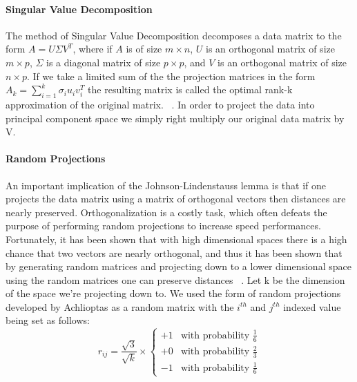 \paragraph{Singular Value Decomposition} %
\label{par:singular_value_decomposition}
The method of Singular Value Decomposition decomposes a data matrix to the form $A = U \Sigma V^T$, where 
if $A$ is of size $m \times n$, $U$ is an orthogonal matrix of size $m \times p$, $\Sigma$ is a diagonal matrix of size $p \times p$, and $V$ is an orthogonal matrix of size $n \times p$. If we take a limited sum of the the projection matrices in the form $A_k = \sum_{i=1}^k\sigma_iu_iv_i^T$ the resulting matrix is called the optimal rank-k approximation of the original matrix. ~\cite{LecturePCA}. In order to project the data into principal component space we simply right multiply our original data matrix by V.
\paragraph{Random Projections} %
\label{par:random_projections}
An important implication of the Johnson-Lindenstauss lemma is that if one projects the data matrix using a matrix of orthogonal vectors then distances are nearly preserved. Orthogonalization is a costly task, which often defeats the purpose of performing random projections to increase speed performances. Fortunately, it has been shown that with high dimensional spaces there is a high chance that two vectors are nearly orthogonal, and thus it has been shown that by generating random matrices and projecting down to a lower dimensional space using the random matrices one can preserve distances ~\cite{sulic2010dimensionality}. Let k be the dimension of the space we're projecting down to. We used the form of random projections developed by Achlioptas as a random matrix with the $i^{th}$ and $j^{th}$ indexed value being set as follows:
	\begin{equation}
 		r_{ij} = \frac{\sqrt{3}}{\sqrt{k}} \times \left\{
			\begin{array}{ll}
				+1  & \mbox{with probability } \frac{1}{6} \\
				+0  & \mbox{with probability } \frac{2}{3} \\
				-1  & \mbox{with probability } \frac{1}{6}
			\end{array}
		\right.
	\end{equation} ~\cite{achlioptas2001database}
